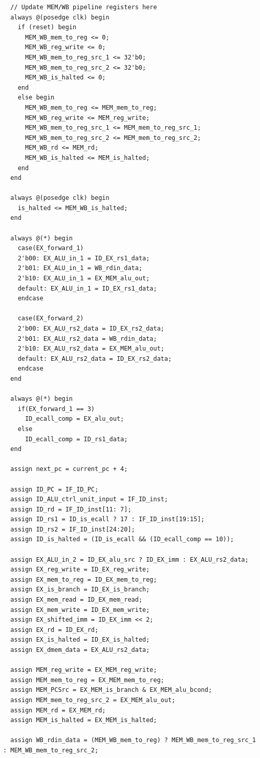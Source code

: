 \documentclass[openright, a4paper]{article}
\newenvironment{longlisting}{\captionsetup{type=listing}}{}
\begin{document}
\begin{longlisting}
\begin{verbatim}
  // Update MEM/WB pipeline registers here
  always @(posedge clk) begin
    if (reset) begin
      MEM_WB_mem_to_reg <= 0;
      MEM_WB_reg_write <= 0;
      MEM_WB_mem_to_reg_src_1 <= 32'b0;
      MEM_WB_mem_to_reg_src_2 <= 32'b0;
      MEM_WB_is_halted <= 0;
    end
    else begin
      MEM_WB_mem_to_reg <= MEM_mem_to_reg;
      MEM_WB_reg_write <= MEM_reg_write;
      MEM_WB_mem_to_reg_src_1 <= MEM_mem_to_reg_src_1;
      MEM_WB_mem_to_reg_src_2 <= MEM_mem_to_reg_src_2;
      MEM_WB_rd <= MEM_rd;
      MEM_WB_is_halted <= MEM_is_halted;
    end
  end

  always @(posedge clk) begin
    is_halted <= MEM_WB_is_halted;
  end

  always @(*) begin
    case(EX_forward_1)
    2'b00: EX_ALU_in_1 = ID_EX_rs1_data;
    2'b01: EX_ALU_in_1 = WB_rdin_data;
    2'b10: EX_ALU_in_1 = EX_MEM_alu_out;
    default: EX_ALU_in_1 = ID_EX_rs1_data;
    endcase
    
    case(EX_forward_2)
    2'b00: EX_ALU_rs2_data = ID_EX_rs2_data;
    2'b01: EX_ALU_rs2_data = WB_rdin_data;
    2'b10: EX_ALU_rs2_data = EX_MEM_alu_out;
    default: EX_ALU_rs2_data = ID_EX_rs2_data;
    endcase
  end

  always @(*) begin
    if(EX_forward_1 == 3)
      ID_ecall_comp = EX_alu_out;
    else
      ID_ecall_comp = ID_rs1_data;
  end

  assign next_pc = current_pc + 4;
  
  assign ID_PC = IF_ID_PC;
  assign ID_ALU_ctrl_unit_input = IF_ID_inst;
  assign ID_rd = IF_ID_inst[11: 7];
  assign ID_rs1 = ID_is_ecall ? 17 : IF_ID_inst[19:15];
  assign ID_rs2 = IF_ID_inst[24:20];
  assign ID_is_halted = (ID_is_ecall && (ID_ecall_comp == 10));
  
  assign EX_ALU_in_2 = ID_EX_alu_src ? ID_EX_imm : EX_ALU_rs2_data;
  assign EX_reg_write = ID_EX_reg_write;
  assign EX_mem_to_reg = ID_EX_mem_to_reg;
  assign EX_is_branch = ID_EX_is_branch;
  assign EX_mem_read = ID_EX_mem_read;
  assign EX_mem_write = ID_EX_mem_write;
  assign EX_shifted_imm = ID_EX_imm << 2;
  assign EX_rd = ID_EX_rd;
  assign EX_is_halted = ID_EX_is_halted;
  assign EX_dmem_data = EX_ALU_rs2_data;
  
  assign MEM_reg_write = EX_MEM_reg_write;
  assign MEM_mem_to_reg = EX_MEM_mem_to_reg;
  assign MEM_PCSrc = EX_MEM_is_branch & EX_MEM_alu_bcond;
  assign MEM_mem_to_reg_src_2 = EX_MEM_alu_out;
  assign MEM_rd = EX_MEM_rd;
  assign MEM_is_halted = EX_MEM_is_halted;
  
  assign WB_rdin_data = (MEM_WB_mem_to_reg) ? MEM_WB_mem_to_reg_src_1 : MEM_WB_mem_to_reg_src_2;
    \end{verbatim}
    \caption{cpu.v}
\end{longlisting}
\end{document}

